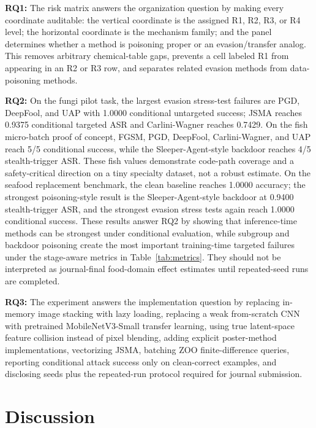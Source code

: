\documentclass[conference]{IEEEtran}
\begin{document}
\textbf{RQ1:} The risk matrix answers the organization question by making every coordinate auditable: the vertical coordinate is the assigned R1, R2, R3, or R4 level; the horizontal coordinate is the mechanism family; and the panel determines whether a method is poisoning proper or an evasion/transfer analog. This removes arbitrary chemical-table gaps, prevents a cell labeled R1 from appearing in an R2 or R3 row, and separates related evasion methods from data-poisoning methods.

\textbf{RQ2:} On the fungi pilot task, the largest evasion stress-test failures are PGD, DeepFool, and UAP with 1.0000 conditional untargeted success; JSMA reaches 0.9375 conditional targeted ASR and Carlini-Wagner reaches 0.7429. On the fish micro-batch proof of concept, FGSM, PGD, DeepFool, Carlini-Wagner, and UAP reach 5/5 conditional success, while the Sleeper-Agent-style backdoor reaches 4/5 stealth-trigger ASR. These fish values demonstrate code-path coverage and a safety-critical direction on a tiny specialty dataset, not a robust estimate. On the seafood replacement benchmark, the clean baseline reaches 1.0000 accuracy; the strongest poisoning-style result is the Sleeper-Agent-style backdoor at 0.9400 stealth-trigger ASR, and the strongest evasion stress tests again reach 1.0000 conditional success. These results answer RQ2 by showing that inference-time methods can be strongest under conditional evaluation, while subgroup and backdoor poisoning create the most important training-time targeted failures under the stage-aware metrics in Table~\ref{tab:metrics}. They should not be interpreted as journal-final food-domain effect estimates until repeated-seed runs are completed.

\textbf{RQ3:} The experiment answers the implementation question by replacing in-memory image stacking with lazy loading, replacing a weak from-scratch CNN with pretrained MobileNetV3-Small transfer learning, using true latent-space feature collision instead of pixel blending, adding explicit poster-method implementations, vectorizing JSMA, batching ZOO finite-difference queries, reporting conditional attack success only on clean-correct examples, and disclosing seeds plus the repeated-run protocol required for journal submission.

\section{Discussion}
\end{document}
